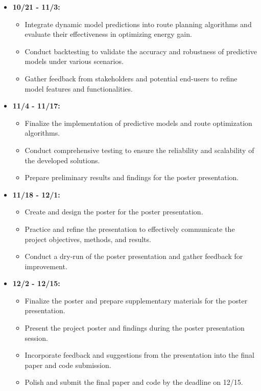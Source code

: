 \documentclass[10pt,twocolumn]{article}
\begin{document}
\begin{itemize}
    \item \textbf{10/21 - 11/3:} 
    \begin{itemize}
        \item Integrate dynamic model predictions into route planning algorithms and evaluate their effectiveness in optimizing energy gain.
        \item Conduct backtesting to validate the accuracy and robustness of predictive models under various scenarios.
        \item Gather feedback from stakeholders and potential end-users to refine model features and functionalities.
    \end{itemize}
    
    \item \textbf{11/4 - 11/17:} 
    \begin{itemize}
        \item Finalize the implementation of predictive models and route optimization algorithms.
        \item Conduct comprehensive testing to ensure the reliability and scalability of the developed solutions.
        \item Prepare preliminary results and findings for the poster presentation.
    \end{itemize}
    
    \item \textbf{11/18 - 12/1:} 
    \begin{itemize}
        \item Create and design the poster for the poster presentation.
        \item Practice and refine the presentation to effectively communicate the project objectives, methods, and results.
        \item Conduct a dry-run of the poster presentation and gather feedback for improvement.
    \end{itemize}
    
    \item \textbf{12/2 - 12/15:} 
    \begin{itemize}
        \item Finalize the poster and prepare supplementary materials for the poster presentation.
        \item Present the project poster and findings during the poster presentation session.
        \item Incorporate feedback and suggestions from the presentation into the final paper and code submission.
        \item Polish and submit the final paper and code by the deadline on 12/15.
    \end{itemize}
\end{itemize}
\end{document}
